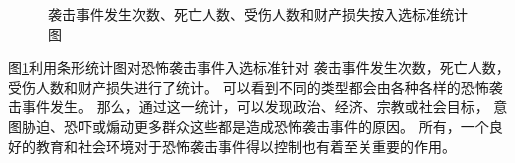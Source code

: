 \documentclass[bwprint]{gmcmthesis}
\begin{document}
\begin{figure}[htbp]
    \caption{袭击事件发生次数、死亡人数、受伤人数和财产损失按入选标准统计图}
    \label{tab:入选标准分布}
\end{figure}

图\ref{tab:入选标准分布}利用条形统计图对恐怖袭击事件入选标准针对
袭击事件发生次数，死亡人数，受伤人数和财产损失进行了统计。
可以看到不同的类型都会由各种各样的恐怖袭击事件发生。
那么，通过这一统计，可以发现政治、经济、宗教或社会目标，
意图胁迫、恐吓或煽动更多群众这些都是造成恐怖袭击事件的原因。
所有，一个良好的教育和社会环境对于恐怖袭击事件得以控制也有着至关重要的作用。
\end{document}

